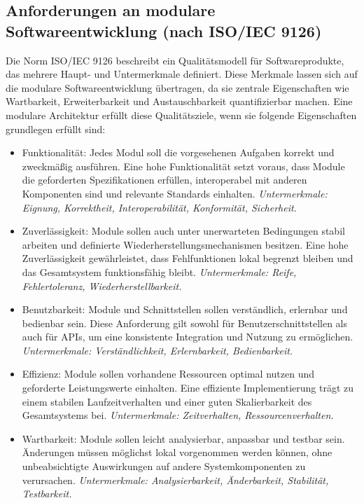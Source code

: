 \subsection{Anforderungen an modulare Softwareentwicklung (nach ISO/IEC 9126)}
\label{sec:anforderungen-an-modulare-softwareentwicklung-(nach-iso/iec-9126)}

Die Norm ISO/IEC 9126 beschreibt ein Qualitätsmodell für Softwareprodukte, das mehrere Haupt- und Untermerkmale definiert.
Diese Merkmale lassen sich auf die modulare Softwareentwicklung übertragen, da sie zentrale Eigenschaften wie Wartbarkeit, Erweiterbarkeit und Austauschbarkeit quantifizierbar machen.
Eine modulare Architektur erfüllt diese Qualitätsziele, wenn sie folgende Eigenschaften grundlegen erfüllt sind:\cite{ISOIEC9126-1991}

\begin{itemize}
    \item Funktionalität:
    Jedes Modul soll die vorgesehenen Aufgaben korrekt und zweckmäßig ausführen.
    Eine hohe Funktionalität setzt voraus, dass Module die geforderten Spezifikationen erfüllen, interoperabel mit anderen Komponenten sind und relevante Standards einhalten.
    \emph{Untermerkmale: Eignung, Korrektheit, Interoperabilität, Konformität, Sicherheit.}

    \item Zuverlässigkeit:
    Module sollen auch unter unerwarteten Bedingungen stabil arbeiten und definierte Wiederherstellungsmechanismen besitzen.
    Eine hohe Zuverlässigkeit gewährleistet, dass Fehlfunktionen lokal begrenzt bleiben und das Gesamtsystem funktionsfähig bleibt.
    \emph{Untermerkmale: Reife, Fehlertoleranz, Wiederherstellbarkeit.}

    \item Benutzbarkeit:
    Module und Schnittstellen sollen verständlich, erlernbar und bedienbar sein.
    Diese Anforderung gilt sowohl für Benutzerschnittstellen als auch für APIs, um eine konsistente Integration und Nutzung zu ermöglichen.
    \emph{Untermerkmale: Verständlichkeit, Erlernbarkeit, Bedienbarkeit.}

    \item Effizienz:
    Module sollen vorhandene Ressourcen optimal nutzen und geforderte Leistungswerte einhalten.
    Eine effiziente Implementierung trägt zu einem stabilen Laufzeitverhalten und einer guten Skalierbarkeit des Gesamtsystems bei.
    \emph{Untermerkmale: Zeitverhalten, Ressourcenverhalten.}

    \item Wartbarkeit:
    Module sollen leicht analysierbar, anpassbar und testbar sein.
    Änderungen müssen möglichst lokal vorgenommen werden können, ohne unbeabsichtigte Auswirkungen auf andere Systemkomponenten zu verursachen.
    \emph{Untermerkmale: Analysierbarkeit, Änderbarkeit, Stabilität, Testbarkeit.}


\end{itemize}
